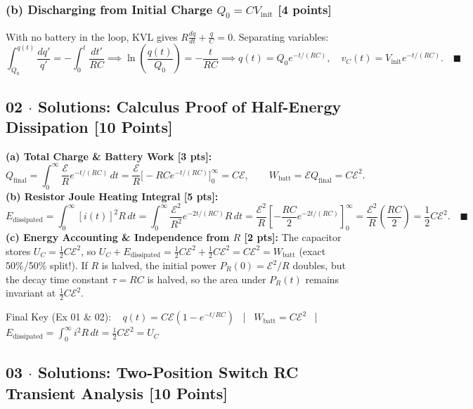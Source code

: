\documentclass[10pt,letterpaper]{article}
\begin{document}
  \subsubsection*{(b) Discharging from Initial Charge $Q_0 = C V_{\text{init}}$ [4 points]}
  With no battery in the loop, KVL gives $R\frac{dq}{dt} + \frac{q}{C} = 0$. Separating variables:
  $$\int_{Q_0}^{q(t)} \frac{dq'}{q'} = -\int_{0}^{t} \frac{dt'}{RC} \implies \ln\left(\frac{q(t)}{Q_0}\right) = -\frac{t}{RC} \implies q(t) = Q_0 e^{-t/(RC)}, \quad v_C(t) = V_{\text{init}} e^{-t/(RC)}. \quad \blacksquare$$


\subsection*{02 $\cdot$ Solutions: Calculus Proof of Half-Energy Dissipation \hfill [10 Points]}


  \textbf{(a) Total Charge \& Battery Work [3 pts]:}
  $$Q_{\text{final}} = \int_{0}^{\infty} \frac{\mathcal{E}}{R}e^{-t/(RC)}\,dt = \frac{\mathcal{E}}{R}\Big[-RC e^{-t/(RC)}\Big]_{0}^{\infty} = C\mathcal{E}, \qquad W_{\text{batt}} = \mathcal{E} Q_{\text{final}} = C\mathcal{E}^2.$$
  \textbf{(b) Resistor Joule Heating Integral [5 pts]:}
  $$E_{\text{dissipated}} = \int_{0}^{\infty} [i(t)]^2 R\,dt = \int_{0}^{\infty} \frac{\mathcal{E}^2}{R^2} e^{-2t/(RC)} R\,dt = \frac{\mathcal{E}^2}{R} \left[-\frac{RC}{2} e^{-2t/(RC)}\right]_{0}^{\infty} = \frac{\mathcal{E}^2}{R}\left(\frac{RC}{2}\right) = \frac{1}{2}C\mathcal{E}^2. \quad \blacksquare$$
  \textbf{(c) Energy Accounting \& Independence from $R$ [2 pts]:} The capacitor stores $U_C = \frac{1}{2}C\mathcal{E}^2$, so $U_C + E_{\text{dissipated}} = \frac{1}{2}C\mathcal{E}^2 + \frac{1}{2}C\mathcal{E}^2 = C\mathcal{E}^2 = W_{\text{batt}}$ (exact 50\%/50\% split!). If $R$ is halved, the initial power $P_R(0) = \mathcal{E}^2/R$ doubles, but the decay time constant $\tau = RC$ is halved, so the area under $P_R(t)$ remains invariant at $\frac{1}{2}C\mathcal{E}^2$.

Final Key (Ex 01 \& 02): ~ $q(t) = C\mathcal{E}(1 - e^{-t/RC})$ ~|~ $W_{\text{batt}} = C\mathcal{E}^2$ ~|~ $E_{\text{dissipated}} = \int_0^\infty i^2 R\,dt = \frac{1}{2}C\mathcal{E}^2 = U_C$


\newpage



\subsection*{03 $\cdot$ Solutions: Two-Position Switch RC Transient Analysis \hfill [10 Points]}
\end{document}
